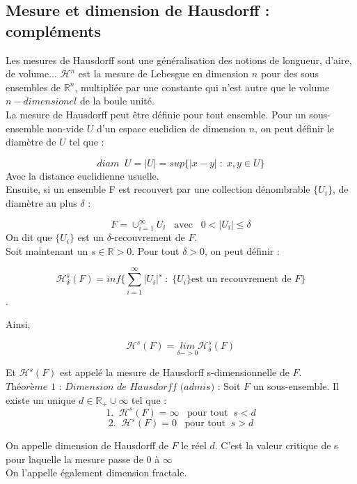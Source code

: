 \subsection{Mesure et dimension de Hausdorff : compléments}
Les mesures de Hausdorff sont une généralisation des notions de longueur, d'aire, de volume... $\mathcal{H}^n$ est la mesure de Lebesgue en dimension $n$ pour des sous ensembles de $\mathbb{R}^n$, multipliée par une constante qui n'est autre que le volume $n-dimensionel$ de la boule unité. \\

La mesure de Hausdorff peut être définie pour tout ensemble. Pour un sous-ensemble non-vide $U$ d'un espace euclidien de dimension $n$, on peut définir le diamètre de $U$ tel que : 

\[ diam \; \; U  =  |U| = sup\{ |x-y| \;  :  \; x,y \in U \}\] 
Avec la distance euclidienne usuelle.\\

Ensuite, si un ensemble F est recouvert par une collection dénombrable $\{U_i\}$, de diamètre au plus $\delta$ : 

\[ F = \cup_{i=1}^{\infty} U_i \; \; \; \text{avec}\; \; \; 0 < |U_i| \leq \delta  \]
 On dit que $\{U_i\}$ est un $\delta$-recouvrement de $F$. \\
 
Soit maintenant un $s \in \mathbb{R} >0 $. Pour tout $\delta >0$, on peut définir : 

\[ \mathcal{H}_{\delta}^s (F) = inf \{ \sum \limits_{i=1}^{\infty} |U_i|^s \; : \; \{U_i\} \text{est un recouvrement de } F\}\].

Ainsi, 

\[ \mathcal{H}^s (F) = \underset{\delta -> 0}{lim} \mathcal{H}_{\delta}^s (F)\] 

Et $\mathcal{H}^s (F)$ est appelé la mesure de Hausdorff s-dimensionnelle de $F$. \\

$\textit{Théorème 1 : Dimension de Hausdorff (admis)}$ : Soit $F$ un sous-ensemble. Il existe un unique  $d \in \mathbb{R}_{+} \cup {\infty}$ tel que : 
\[ 1. \; \; \mathcal{H}^s (F) = \infty \; \; \; \text{pour tout} \; \;  s<d \] 
\[ 2. \; \; \mathcal{H}^s (F) = 0 \; \; \; \text{pour tout} \; \; s>d \] 

On appelle dimension de Hausdorff de $F$ le réel $d$. C'est la valeur critique de s pour laquelle la mesure passe de $0$ à $\infty$ \\

On l'appelle également dimension fractale. 

